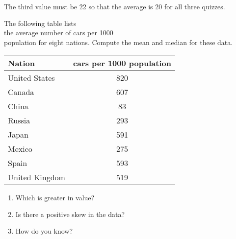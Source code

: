 \documentclass[11pt]{book}\usepackage[]{graphicx}\usepackage[]{color}
\begin{document}
\begin{exercises}
\begin{exercise}
	\vspace{5mm}
	\end{exercise}
	\vspace{2mm}
	\begin{solution}   %

	The third value must be 22 so that the average is 20 for all three quizzes.

	\end{solution}

  \begin{exercise} %

    The following table lists \\ the average number of cars per 1000 \\ population for eight nations. Compute the mean and median for these data.

  {\small{
   \begin{tabular}{@{} lc @{}} \hline  %
   Nation & cars per 1000 population \\ \hline
   United States & 820 \\
   Canada & 607 \\
   China & 83 \\
   Russia & 293 \\
   Japan & 591 \\
   Mexico & 275 \\
   Spain & 593 \\
   United Kingdom & 519 \\ \hline
   \end{tabular}
  }}


  \begin{enumerate}
  \item Which is greater in value?
  \item Is there a positive skew in the data?
  \item How do you know?
  \end{enumerate}

  \end{exercise}
  \begin{solution}   %





\end{solution}
\end{exercises}
\end{document}
